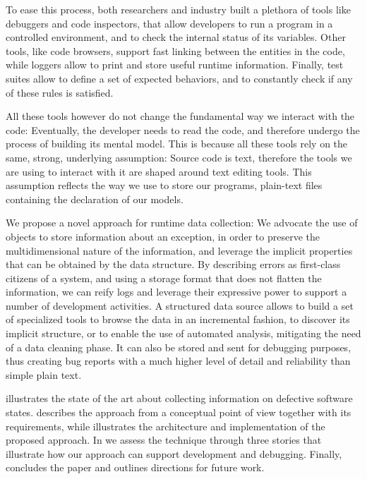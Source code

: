 To ease this process, both researchers and industry built a plethora of tools like debuggers and code inspectors, that allow developers to run a program in a controlled environment, and to check the internal status of its variables.
Other tools, like code browsers, support fast linking between the entities in the code, while loggers allow to print and store useful runtime information. Finally, test suites allow to define a set of expected behaviors, and to constantly check if any of these rules is satisfied.

All these tools however do not change the fundamental way we interact with the code: Eventually, the developer needs to read the code, and therefore undergo the process of building its mental model. This is because all these tools rely on the same, strong, underlying assumption: Source code is text, therefore the tools we are using to interact with it are shaped around text editing tools. This assumption reflects the way we use to store our programs, \ie plain-text files containing the declaration of our models.

We propose a novel approach for runtime data collection: We advocate the use of objects to store information about an exception, in order to preserve the multidimensional nature of the information, and leverage the implicit properties that can be obtained by the data structure. By describing errors as first-class citizens of a system, and using a storage format that does not flatten the information, we can reify logs and leverage their expressive power to support a number of development activities. A structured data source allows to build a set of specialized tools to browse the data in an incremental fashion, to discover its implicit structure, or to enable the use of automated analysis, mitigating the need of a data cleaning phase. It can also be stored and sent for debugging purposes, thus creating bug reports with a much higher level of detail and reliability than simple plain text.

  illustrates  the state of the art about collecting information on defective software states.  describes the approach from a conceptual point of view together with its requirements, while  illustrates the architecture and implementation of the proposed approach. In  we assess the technique through three stories that illustrate how our approach can support development and debugging. Finally,  concludes the paper and outlines directions for future work.


